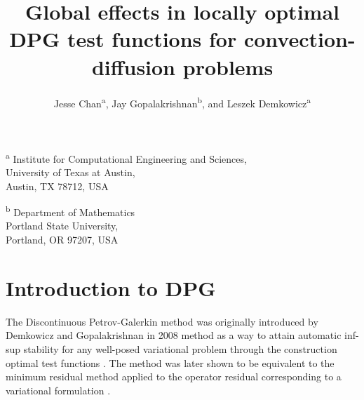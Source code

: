 \documentclass[11pt,onecolumn]{scrartcl}
\author{Jesse Chan\textsuperscript{a}, Jay Gopalakrishnan\textsuperscript{b}, and Leszek Demkowicz\textsuperscript{a}}
\title{Global effects in locally optimal DPG test functions for convection-diffusion problems}
\date{}
\begin{document}
\maketitle
\begin{center}
\textsuperscript{a} Institute for Computational Engineering and Sciences, \\University of Texas at Austin, \\Austin, TX 78712, USA\\
\end{center}

\begin{center}
\textsuperscript{b} Department of Mathematics\\Portland State University, \\
Portland, OR 97207, USA
\end{center}

\tableofcontents

\section{Introduction to DPG}

The Discontinuous Petrov-Galerkin method was originally introduced by Demkowicz and Gopalakrishnan in 2008 method as a way to attain automatic inf-sup stability for any well-posed variational problem through the construction optimal test functions \cite{DPG2}.  The method was later shown to be equivalent to the minimum residual method applied to the operator residual corresponding to a variational formulation \cite{DPG2, ChanHeuerBui-ThanhDemkowicz12}.  
\end{document}
